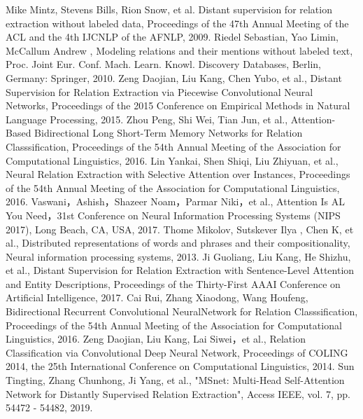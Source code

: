 \documentclass[UTF8]{csoarticle}
\begin{document}
\begin{thebibliography}{11}
     Mike Mintz, Stevens Bills, Rion Snow, et al. Distant supervision for relation extraction without labeled data, Proceedings of the 47th Annual Meeting of the ACL and the 4th IJCNLP of the AFNLP, 2009.
     Riedel Sebastian, Yao Limin, McCallum Andrew , Modeling relations and their mentions without labeled text, Proc. Joint Eur. Conf. Mach. Learn. Knowl. Discovery Databases, Berlin, Germany: Springer, 2010.
     Zeng Daojian, Liu Kang, Chen Yubo, et al., Distant Supervision for Relation Extraction via Piecewise Convolutional Neural Networks, Proceedings of the 2015 Conference on Empirical Methods in Natural Language Processing, 2015.
     Zhou Peng, Shi Wei, Tian Jun, et al.,  Attention-Based Bidirectional Long Short-Term Memory Networks for Relation Classsification, Proceedings of the 54th Annual Meeting of the Association for Computational Linguistics, 2016.
     Lin Yankai, Shen Shiqi, Liu Zhiyuan, et al., Neural Relation Extraction with Selective Attention over Instances, Proceedings of the 54th Annual Meeting of the Association for Computational Linguistics, 2016.
     Vaswani，Ashish，Shazeer Noam，Parmar Niki，et al., Attention Is AL You Need，31st Conference on Neural Information Processing Systems (NIPS 2017), Long Beach, CA, USA, 2017.
     Thome Mikolov, Sutskever Ilya , Chen K, et al., Distributed representations of words and phrases and their compositionality, Neural information processing systems, 2013.
     Ji Guoliang, Liu Kang, He Shizhu, et al., Distant Supervision for Relation Extraction with Sentence-Level Attention and Entity Descriptions, Proceedings of the Thirty-First AAAI Conference on Artificial Intelligence, 2017.
     Cai Rui, Zhang Xiaodong, Wang Houfeng, Bidirectional Recurrent Convolutional NeuralNetwork for Relation Classsification, Proceedings of the 54th Annual Meeting of the Association for Computational Linguistics, 2016.
     Zeng Daojian, Liu Kang, Lai Siwei，et al., Relation Classification via Convolutional Deep Neural Network, Proceedings of COLING 2014, the 25th International Conference on Computational Linguistics, 2014.
     Sun Tingting, Zhang Chunhong, Ji Yang, et al., "MSnet: Multi-Head Self-Attention Network for Distantly Supervised Relation Extraction", Access IEEE, vol. 7, pp. 54472 - 54482, 2019.
    
\end{thebibliography}
\end{document}

